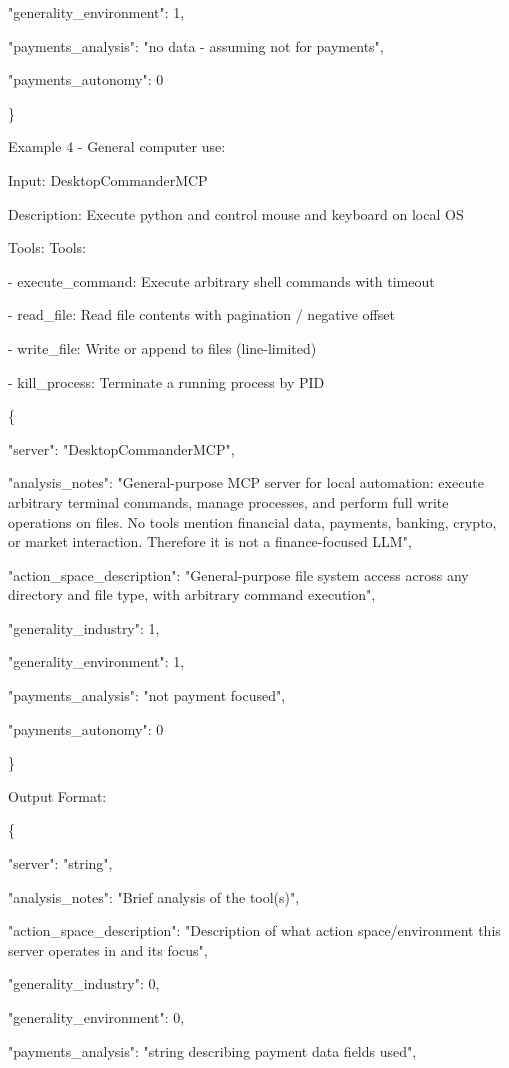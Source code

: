 \documentclass[manuscript,screen,nonacm,oneside]{acmart}
\begin{document}
"generality\_environment": 1,

"payments\_analysis": "no data - assuming not for payments",

"payments\_autonomy": 0

\}

Example 4 - General computer use:

Input: DesktopCommanderMCP

Description: Execute python and control mouse and keyboard on local OS

Tools: Tools:

- execute\_command: Execute arbitrary shell commands with timeout

- read\_file: Read file contents with pagination / negative offset

- write\_file: Write or append to files (line-limited)

- kill\_process: Terminate a running process by PID

\{

"server": "DesktopCommanderMCP",

"analysis\_notes": "General-purpose MCP server for local automation: execute arbitrary terminal commands, manage processes, and perform full write operations on files. No tools mention financial data, payments, banking, crypto, or market interaction. Therefore it is not a finance-focused LLM",

"action\_space\_description": "General-purpose file system access across any directory and file type, with arbitrary command execution",

"generality\_industry": 1,

"generality\_environment": 1,

"payments\_analysis": "not payment focused",

"payments\_autonomy": 0

\}

Output Format:

\{

"server": "string",

"analysis\_notes": "Brief analysis of the tool(s)",

"action\_space\_description": "Description of what action space/environment this server operates in and its focus",

"generality\_industry": 0,

"generality\_environment": 0,

"payments\_analysis": "string describing payment data fields used",
\end{document}

